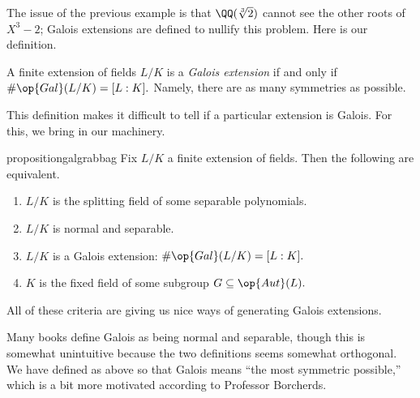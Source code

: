 The issue of the previous example is that $\QQ(\sqrt[3]2)$ cannot see the other roots of $X^3-2$; Galois extensions are defined to nullify this problem. Here is our definition.
\begin{definition} \label{defi:galii}
	A finite extension of fields $L/K$ is a \textit{Galois extension} if and only if $\#\op{Gal}(L/K)=[L:K].$ Namely, there are as many symmetries as possible.
\end{definition}
This definition makes it difficult to tell if a particular extension is Galois. For this, we bring in our machinery.
\begin{restatable}{proposition}{galgrabbag}\label{prop:galgrabbag}
	Fix $L/K$ a finite extension of fields. Then the following are equivalent.
	\begin{enumerate}[label=(\alph*)]
		\item $L/K$ is the splitting field of some separable polynomials.
		\item $L/K$ is normal and separable.
		\item $L/K$ is a Galois extension: $\#\op{Gal}(L/K)=[L:K].$
		\item $K$ is the fixed field of some subgroup $G\subseteq\op{Aut}(L).$
	\end{enumerate}
\end{restatable}
All of these criteria are giving us nice ways of generating Galois extensions.
\begin{remark}
	Many books define Galois as being normal and separable, though this is somewhat unintuitive because the two definitions seems somewhat orthogonal. We have defined as above so that Galois means ``the most symmetric possible,'' which is a bit more motivated according to Professor Borcherds.
\end{remark}
